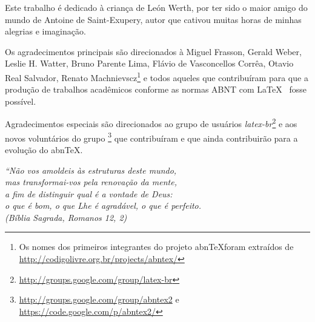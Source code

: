 \documentclass[12pt,openright,twoside,a4paper]{abntex2}
\begin{document}

\imprimircapa

\imprimirfolhaderosto*







\begin{dedicatoria}
Este trabalho é dedicado à criança de León Werth, por ter sido o maior amigo do
mundo de Antoine de Saint-Exupery, autor que cativou muitas horas de minhas
alegrias e imaginação.
\end{dedicatoria}

\begin{agradecimentos}
Os agradecimentos principais são direcionados à Miguel Frasson, Gerald Weber,
Leslie H. Watter, Bruno Parente Lima, Flávio de Vasconcellos Corrêa, Otavio Real
Salvador, Renato Machnievscz\footnote{Os nomes dos primeiros integrantes do
projeto abn\TeX foram extraídos de
\url{http://codigolivre.org.br/projects/abntex/}} e todos aqueles que
contribuíram para que a produção de trabalhos acadêmicos conforme
as normas ABNT com \LaTeX~ fosse possível.

Agradecimentos especiais são direcionados ao grupo de usuários
\emph{latex-br}\footnote{\url{http://groups.google.com/group/latex-br}} e aos
novos voluntários do grupo \emph{\abnTeX}
\footnote{\url{http://groups.google.com/group/abntex2} e
\url{https://code.google.com/p/abntex2/}} que contribuíram e que ainda
contribuirão para a evolução do abn\TeX.
\end{agradecimentos}

\begin{epigrafe}
    \vspace*{\fill}
	\begin{flushright}
		\textit{``Não vos amoldeis às estruturas deste mundo, \\
		mas transformai-vos pela renovação da mente, \\
		a fim de distinguir qual é a vontade de Deus: \\
		o que é bom, o que Lhe é agradável, o que é perfeito.\\
		(Bíblia Sagrada, Romanos 12, 2)}
	\end{flushright}
\end{epigrafe}
\end{document}
